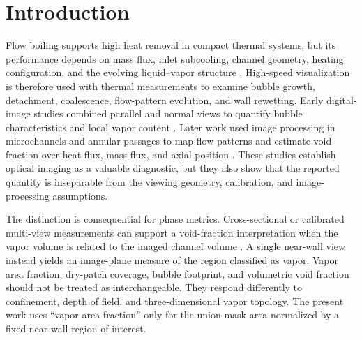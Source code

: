 \documentclass[preprint,12pt,sort&compress]{elsarticle}
\begin{document}
\linenumbers

\section{Introduction}

Flow boiling supports high heat removal in compact thermal systems, but its performance depends on mass flux, inlet subcooling, channel geometry, heating configuration, and the evolving liquid--vapor structure \cite{Mudawar2001,Mudawar2011,Kharangate2015,Shingote2024}. High-speed visualization is therefore used with thermal measurements to examine bubble growth, detachment, coalescence, flow-pattern evolution, and wall rewetting. Early digital-image studies combined parallel and normal views to quantify bubble characteristics and local vapor content \cite{Maurus2002}. Later work used image processing in microchannels and annular passages to map flow patterns and estimate void fraction over heat flux, mass flux, and axial position \cite{Singh2009,Rana2014,Placzkowski2021Photographic,Li2021Visualization,Puli2012VoidFraction}. These studies establish optical imaging as a valuable diagnostic, but they also show that the reported quantity is inseparable from the viewing geometry, calibration, and image-processing assumptions.

The distinction is consequential for phase metrics. Cross-sectional or calibrated multi-view measurements can support a void-fraction interpretation when the vapor volume is related to the imaged channel volume \cite{Maurus2002,Chu2021}. A single near-wall view instead yields an image-plane measure of the region classified as vapor. Vapor area fraction, dry-patch coverage, bubble footprint, and volumetric void fraction should not be treated as interchangeable. They respond differently to confinement, depth of field, and three-dimensional vapor topology. The present work uses ``vapor area fraction'' only for the union-mask area normalized by a fixed near-wall region of interest.
\end{document}
